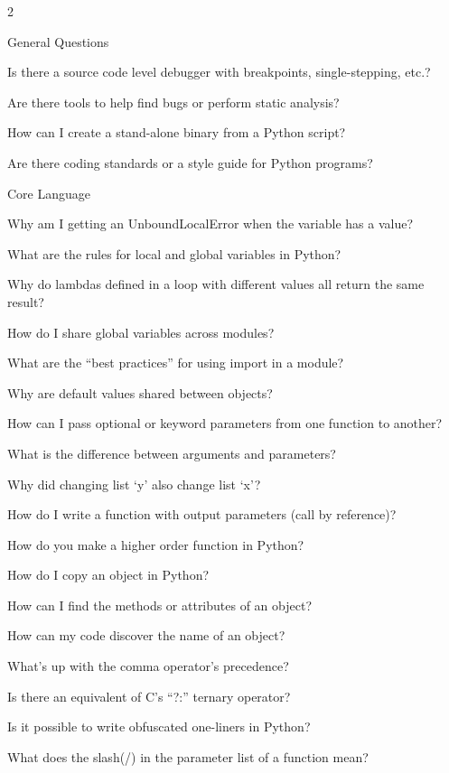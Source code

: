 \documentclass [8pt] {extarticle}
\begin{document}
    \begin {multicols} {2}

        General Questions

            Is there a source code level debugger with breakpoints, single-stepping, etc.?

            Are there tools to help find bugs or perform static analysis?

            How can I create a stand-alone binary from a Python script?

            Are there coding standards or a style guide for Python programs?

        Core Language

            Why am I getting an UnboundLocalError when the variable has a value?

            What are the rules for local and global variables in Python?

            Why do lambdas defined in a loop with different values all return the same result?

            How do I share global variables across modules?

            What are the “best practices” for using import in a module?

            Why are default values shared between objects?

            How can I pass optional or keyword parameters from one function to another?

            What is the difference between arguments and parameters?

            Why did changing list ‘y’ also change list ‘x’?

            How do I write a function with output parameters (call by reference)?

            How do you make a higher order function in Python?

            How do I copy an object in Python?

            How can I find the methods or attributes of an object?

            How can my code discover the name of an object?

            What’s up with the comma operator’s precedence?

            Is there an equivalent of C’s “?:” ternary operator?

            Is it possible to write obfuscated one-liners in Python?

            What does the slash(/) in the parameter list of a function mean?


\end{multicols}
\end{document}

